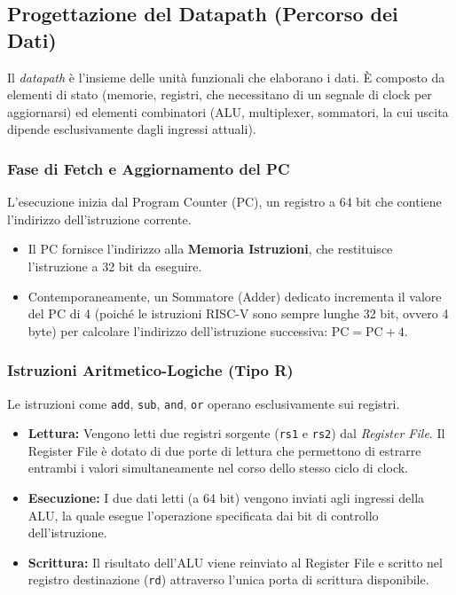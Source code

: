 \documentclass[12pt, a4paper]{article}
\begin{document}
\subsection{Progettazione del Datapath (Percorso dei Dati)}
Il \textit{datapath} è l'insieme delle unità funzionali che elaborano i dati. È composto da elementi di stato (memorie, registri, che necessitano di un segnale di clock per aggiornarsi) ed elementi combinatori (ALU, multiplexer, sommatori, la cui uscita dipende esclusivamente dagli ingressi attuali).

\subsubsection{Fase di Fetch e Aggiornamento del PC}
L'esecuzione inizia dal Program Counter (PC), un registro a 64 bit che contiene l'indirizzo dell'istruzione corrente. 
\begin{itemize}
    \item Il PC fornisce l'indirizzo alla \textbf{Memoria Istruzioni}, che restituisce l'istruzione a 32 bit da eseguire.
    \item Contemporaneamente, un Sommatore (Adder) dedicato incrementa il valore del PC di 4 (poiché le istruzioni RISC-V sono sempre lunghe 32 bit, ovvero 4 byte) per calcolare l'indirizzo dell'istruzione successiva: $\text{PC} = \text{PC} + 4$.
\end{itemize}

\subsubsection{Istruzioni Aritmetico-Logiche (Tipo R)}
Le istruzioni come \texttt{add}, \texttt{sub}, \texttt{and}, \texttt{or} operano esclusivamente sui registri.
\begin{itemize}
    \item \textbf{Lettura:} Vengono letti due registri sorgente (\texttt{rs1} e \texttt{rs2}) dal \textit{Register File}. Il Register File è dotato di due porte di lettura che permettono di estrarre entrambi i valori simultaneamente nel corso dello stesso ciclo di clock.
    \item \textbf{Esecuzione:} I due dati letti (a 64 bit) vengono inviati agli ingressi della ALU, la quale esegue l'operazione specificata dai bit di controllo dell'istruzione.
    \item \textbf{Scrittura:} Il risultato dell'ALU viene reinviato al Register File e scritto nel registro destinazione (\texttt{rd}) attraverso l'unica porta di scrittura disponibile.
\end{itemize}
\end{document}
